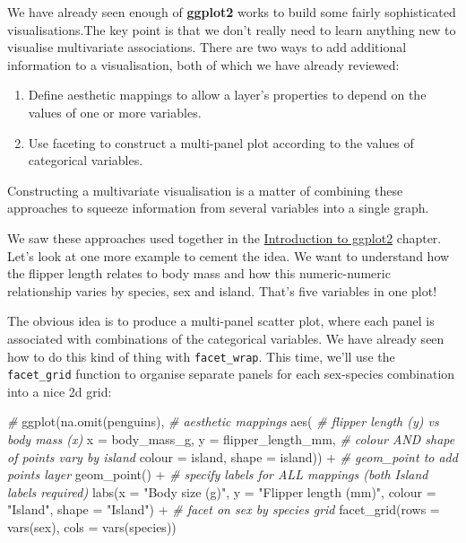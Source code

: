 \documentclass[
]{book}
\newenvironment{Shaded}{\begin{snugshade}}{\end{snugshade}}
\newcommand{\AttributeTok}[1]{\textcolor[rgb]{0.77,0.63,0.00}{#1}}
\newcommand{\CommentTok}[1]{\textcolor[rgb]{0.56,0.35,0.01}{\textit{#1}}}
\newcommand{\FunctionTok}[1]{\textcolor[rgb]{0.00,0.00,0.00}{#1}}
\newcommand{\NormalTok}[1]{#1}
\newcommand{\SpecialCharTok}[1]{\textcolor[rgb]{0.00,0.00,0.00}{#1}}
\newcommand{\StringTok}[1]{\textcolor[rgb]{0.31,0.60,0.02}{#1}}
\providecommand{\tightlist}{%
  \setlength{\itemsep}{0pt}\setlength{\parskip}{0pt}}
\begin{document}
We have already seen enough of \textbf{ggplot2} works to build some fairly sophisticated visualisations.The key point is that we don't really need to learn anything new to visualise multivariate associations. There are two ways to add additional information to a visualisation, both of which we have already reviewed:

\begin{enumerate}
\def\labelenumi{\arabic{enumi}.}
\tightlist
\item
  Define aesthetic mappings to allow a layer's properties to depend on the values of one or more variables.
\item
  Use faceting to construct a multi-panel plot according to the values of categorical variables.
\end{enumerate}

Constructing a multivariate visualisation is a matter of combining these approaches to squeeze information from several variables into a single graph.

We saw these approaches used together in the \protect\hyperlink{chapter-ggplot2-intro}{Introduction to ggplot2} chapter. Let's look at one more example to cement the idea. We want to understand how the flipper length relates to body mass and how this numeric-numeric relationship varies by species, sex and island. That's five variables in one plot!

The obvious idea is to produce a multi-panel scatter plot, where each panel is associated with combinations of the categorical variables. We have already seen how to do this kind of thing with \texttt{facet\_wrap}. This time, we'll use the \texttt{facet\_grid} function to organise separate panels for each sex-species combination into a nice 2d grid:

\begin{Shaded}
\begin{Highlighting}[]
\CommentTok{\# }
\FunctionTok{ggplot}\NormalTok{(}\FunctionTok{na.omit}\NormalTok{(penguins), }
       \CommentTok{\# aesthetic mappings}
       \FunctionTok{aes}\NormalTok{(}
         \CommentTok{\# flipper length (y) vs body mass (x)}
         \AttributeTok{x =}\NormalTok{ body\_mass\_g, }\AttributeTok{y =}\NormalTok{ flipper\_length\_mm, }
         \CommentTok{\# colour AND shape of points vary by island}
         \AttributeTok{colour =}\NormalTok{ island, }\AttributeTok{shape =}\NormalTok{ island)) }\SpecialCharTok{+}
  \CommentTok{\# geom\_point to add points layer}
  \FunctionTok{geom\_point}\NormalTok{() }\SpecialCharTok{+} 
  \CommentTok{\# specify labels for ALL mappings (both Island labels required)}
  \FunctionTok{labs}\NormalTok{(}\AttributeTok{x =} \StringTok{"Body size (g)"}\NormalTok{, }
       \AttributeTok{y =} \StringTok{"Flipper length (mm)"}\NormalTok{,}
       \AttributeTok{colour =} \StringTok{"Island"}\NormalTok{, }\AttributeTok{shape =} \StringTok{"Island"}\NormalTok{) }\SpecialCharTok{+}
  \CommentTok{\# facet on sex by species grid}
  \FunctionTok{facet\_grid}\NormalTok{(}\AttributeTok{rows =} \FunctionTok{vars}\NormalTok{(sex), }\AttributeTok{cols =} \FunctionTok{vars}\NormalTok{(species))}
\end{Highlighting}
\end{Shaded}
\end{document}
